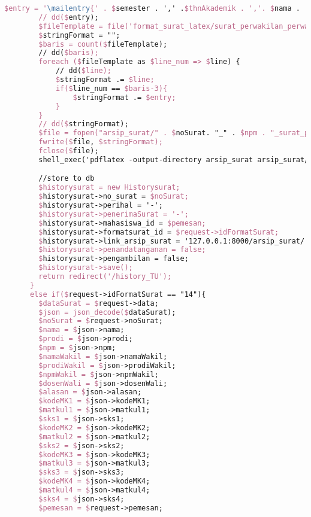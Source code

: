 \begin{lstlisting}[language=tex,basicstyle=\tiny,caption=HistorysuratController.php]
        $entry = '\mailentry{' . $semester . ',' .$thnAkademik . ','. $nama . ',' . $prodi . ',' . $npm . ',' . $namaWakil . ',' . $prodiWakil . ',' . $npmWakil . ',' . $alasan . ',' . $kodeMK1 . ',' . $matkul1 . ',' . $sks1 . ',' . $kodeMK2 . ',' . $matkul2 . ',' . $sks2 . ',' . $kodeMK3 . ',' . $matkul3 . ','. $sks3 .'}';
        // dd($entry);
        $fileTemplate = file('format_surat_latex/surat_perwakilan_perwalian_3mk.tex');
        $stringFormat = "";
        $baris = count($fileTemplate);
        // dd($baris);
        foreach ($fileTemplate as $line_num => $line) {
            // dd($line);
            $stringFormat .= $line;
            if($line_num == $baris-3){
                $stringFormat .= $entry;
            }
        }
        // dd($stringFormat);
        $file = fopen("arsip_surat/" . $noSurat. "_" . $npm . "_surat_perwakilan_perwalian_3mk.tex", "w");
        fwrite($file, $stringFormat);
        fclose($file);
        shell_exec('pdflatex -output-directory arsip_surat arsip_surat/' . $noSurat . '_' . $npm . '_surat_perwakilan_perwalian_3mk.tex');

        //store to db
        $historysurat = new Historysurat;
        $historysurat->no_surat = $noSurat;
        $historysurat->perihal = '-';
        $historysurat->penerimaSurat = '-';
        $historysurat->mahasiswa_id = $pemesan;
        $historysurat->formatsurat_id = $request->idFormatSurat;
        $historysurat->link_arsip_surat = '127.0.0.1:8000/arsip_surat/' . $noSurat. '_' . $npm . '_surat_perwakilan_perwalian_3mk.pdf';
        $historysurat->penandatanganan = false;
        $historysurat->pengambilan = false;
        $historysurat->save();
        return redirect('/history_TU');
      }
      else if($request->idFormatSurat == "14"){
        $dataSurat = $request->data;
        $json = json_decode($dataSurat);
        $noSurat = $request->noSurat;
        $nama = $json->nama;
        $prodi = $json->prodi;
        $npm = $json->npm;
        $namaWakil = $json->namaWakil;
        $prodiWakil = $json->prodiWakil;
        $npmWakil = $json->npmWakil;
        $dosenWali = $json->dosenWali;
        $alasan = $json->alasan;
        $kodeMK1 = $json->kodeMK1;
        $matkul1 = $json->matkul1;
        $sks1 = $json->sks1;
        $kodeMK2 = $json->kodeMK2;
        $matkul2 = $json->matkul2;
        $sks2 = $json->sks2;
        $kodeMK3 = $json->kodeMK3;
        $matkul3 = $json->matkul3;
        $sks3 = $json->sks3;
        $kodeMK4 = $json->kodeMK4;
        $matkul4 = $json->matkul4;
        $sks4 = $json->sks4;
        $pemesan = $request->pemesan;


\end{lstlisting}
